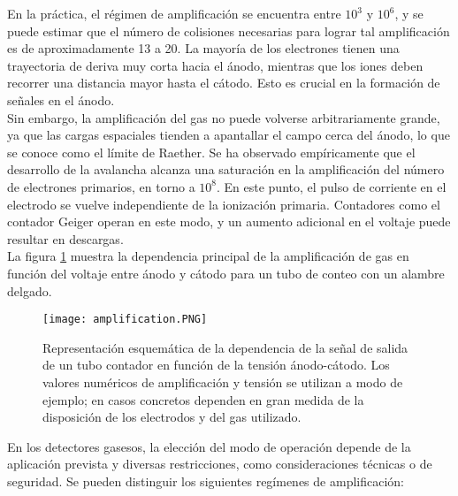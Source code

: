 \documentclass{article}
\begin{document}
\noindent En la práctica, el régimen de amplificación se encuentra entre \(10^3\) y \(10^6\), y se puede estimar que el número de colisiones necesarias para lograr tal amplificación es de aproximadamente 13 a 20. La mayoría de los electrones tienen una trayectoria de deriva muy corta hacia el ánodo, mientras que los iones deben recorrer una distancia mayor hasta el cátodo. Esto es crucial en la formación de señales en el ánodo.\\

\noindent Sin embargo, la amplificación del gas no puede volverse arbitrariamente grande, ya que las cargas espaciales tienden a apantallar el campo cerca del ánodo, lo que se conoce como el límite de Raether. Se ha observado empíricamente que el desarrollo de la avalancha alcanza una saturación en la amplificación del número de electrones primarios, en torno a \(10^8\). En este punto, el pulso de corriente en el electrodo se vuelve independiente de la ionización primaria. Contadores como el contador Geiger operan en este modo, y un aumento adicional en el voltaje puede resultar en descargas.\\

\noindent La figura \ref{fig:amplification} muestra la dependencia principal de la amplificación de gas en función del voltaje entre ánodo y cátodo para un tubo de conteo con un alambre delgado. 


\begin{figure}[H]
    \centering
    \texttt{[image: amplification.PNG]}
    \caption{Representación esquemática de la dependencia de la
    señal de salida de un tubo contador en función de la tensión ánodo-cátodo. Los valores numéricos de amplificación y tensión se utilizan a modo de ejemplo; en casos concretos dependen en gran medida de la disposición de los electrodos y del gas utilizado. }
    \label{fig:amplification}
\end{figure}

\noindent En los detectores gasesos, la elección del modo de operación depende de la aplicación prevista y diversas restricciones, como consideraciones técnicas o de seguridad. Se pueden distinguir los siguientes regímenes de amplificación: 
\end{document}

